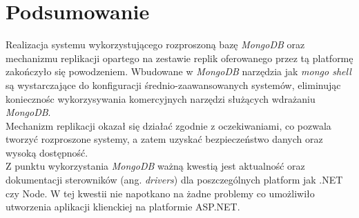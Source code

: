\section{Podsumowanie}
Realizacja systemu wykorzystującego rozproszoną bazę \textit{MongoDB} oraz mechanizmu replikacji opartego na zestawie replik oferowanego przez tą platformę zakończyło się powodzeniem. Wbudowane w \textit{MongoDB} narzędzia jak \textit{mongo shell} są wystarczające do konfiguracji średnio-zaawansowanych systemów, eliminując koniecznośc wykorzysywania komercyjnych narzędzi służących wdrażaniu \textit{MongoDB}. \\
Mechanizm replikacji okazał się działać zgodnie z oczekiwaniami, co pozwala tworzyć rozproszone systemy, a zatem uzyskać bezpieczeństwo danych oraz wysoką dostępność. \\
Z punktu wykorzystania \textit{MongoDB} ważną kwestią jest aktualność oraz dokumentacji sterowników (ang. \textit{drivers}) dla poszczególnych platform jak .NET czy Node. W tej kwestii nie napotkano na żadne problemy co umożliwiło utworzenia aplikacji klienckiej na platformie ASP.NET.